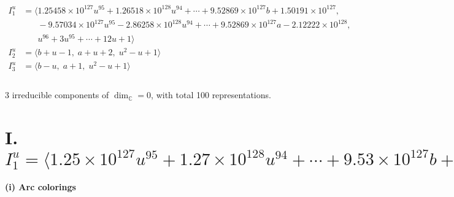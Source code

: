 \documentclass[1p]{elsarticle_modified}
\theoremstyle{definition}
\begin{document}
\begin{align*}
I^u_{1}&=\langle 
1.25458\times10^{127} u^{95}+1.26518\times10^{128} u^{94}+\cdots+9.52869\times10^{127} b+1.50191\times10^{127},\\
\phantom{I^u_{1}}&\phantom{= \langle  }-9.57034\times10^{127} u^{95}-2.86258\times10^{128} u^{94}+\cdots+9.52869\times10^{127} a-2.12222\times10^{128},\\
\phantom{I^u_{1}}&\phantom{= \langle  }u^{96}+3 u^{95}+\cdots+12 u+1\rangle \\
I^u_{2}&=\langle 
b+u-1,\;a+u+2,\;u^2- u+1\rangle \\
I^u_{3}&=\langle 
b- u,\;a+1,\;u^2- u+1\rangle \\
\\
\end{align*}
\raggedright * 3 irreducible components of $\dim_{\mathbb{C}}=0$, with total 100 representations.\\
\newpage
\renewcommand{\arraystretch}{1}
\centering \section*{I. $I^u_{1}= \langle 1.25\times10^{127} u^{95}+1.27\times10^{128} u^{94}+\cdots+9.53\times10^{127} b+1.50\times10^{127},\;-9.57\times10^{127} u^{95}-2.86\times10^{128} u^{94}+\cdots+9.53\times10^{127} a-2.12\times10^{128},\;u^{96}+3 u^{95}+\cdots+12 u+1 \rangle$}
\flushleft \textbf{(i) Arc colorings}\\
\end{document}

